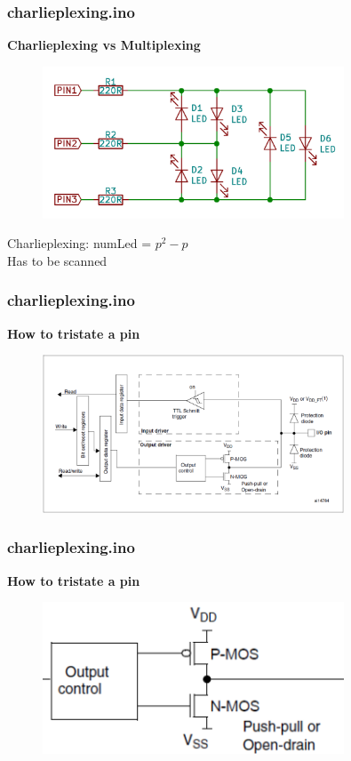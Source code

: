 \documentclass[t]{beamer}
\begin{document}
\begin{frame}[t]
\frametitle{charlieplexing.ino}
\textbf{Charlieplexing vs Multiplexing}

\begin{figure}
	\includegraphics[width=0.8\textwidth]{charliePlexing.PNG}
\end{figure}
\centering
Charlieplexing: numLed = $p^2-p$ \\
Has to be scanned

\end{frame}


\begin{frame}[t]
\frametitle{charlieplexing.ino}
\textbf{How to tristate a pin}

\begin{figure}
	\includegraphics[width=0.8\textwidth]{gpioOutput.png}
\end{figure}


\end{frame}


\begin{frame}[t]
\frametitle{charlieplexing.ino}
\textbf{How to tristate a pin}

\begin{figure}
	\includegraphics[width=0.8\textwidth]{gpioOutputClose.png}
\end{figure}

\end{frame}
\end{document}
